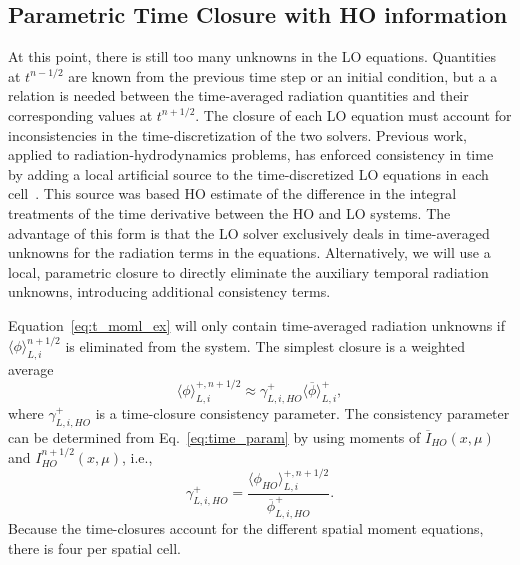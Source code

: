 \documentclass{anstrans}
\newcommand{\mom}[1]{\langle #1 \rangle}
\begin{document}
\subsection{Parametric Time Closure with HO information}

At this point, there is still too many unknowns in the LO equations. 
Quantities at $t^{n-1/2}$ are known from the previous time step or an initial condition, but a
a relation is needed between the time-averaged radiation quantities and their corresponding values at $t^{n+1/2}$.
The closure of each LO equation  must account for inconsistencies in the
time-discretization of the two solvers. 
Previous work, applied to radiation-hydrodynamics problems, has enforced
consistency in time by adding a local artificial source to the time-discretized LO
equations in each cell~\cite{holo_rh}.  This
source was based HO estimate of the difference in the integral treatments of the time
derivative between the HO and LO systems.  The advantage
of this form is that the LO solver exclusively deals in
time-averaged unknowns for the radiation terms in the equations. 
Alternatively, we will use a local, parametric closure to directly eliminate the auxiliary temporal
radiation unknowns, introducing additional consistency terms.

Equation~\eqref{eq:t_moml_ex} will only contain time-averaged radiation unknowns 
if $\mom{\phi}_{L,i}^{n+1/2}$ is eliminated from the
system.  The simplest closure is a weighted average
\begin{equation}\label{eq:time_param}
    \mom{\phi}_{L,i}^{+,n+1/2} \approx \gamma_{L,i,HO}^+ \mom{\overline{\phi}}_{L,i}^+,
\end{equation}
where $\gamma_{L,i,HO}^+$ is a time-closure consistency parameter.  The consistency
parameter can be determined from Eq.~\eqref{eq:time_param} by using moments of $\overline{I}_{HO}(x,\mu)$ and
$I^{n+1/2}_{HO}(x,\mu)$, i.e.,
\begin{equation}
    \gamma_{L,i,HO}^+ = \frac{\mom{\phi_{HO}}_{L,i}^{+,n+1/2}}{\overline{\phi}_{L,i,HO}^+}.
\end{equation}
Because the time-closures account for the different spatial moment equations, there is four per
spatial cell.
\end{document}
